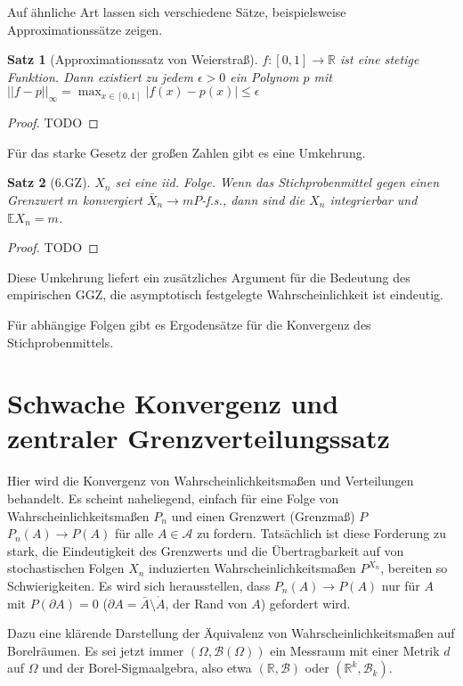 \documentclass[]{article}
\newtheorem{theorem}{Satz}
\begin{document}
Auf ähnliche Art lassen sich verschiedene Sätze, beispielsweise Approximationssätze zeigen.

\begin{theorem}[Approximationssatz von Weierstraß]
	$f:[0,1]\rightarrow\mathbb{R}$ ist eine stetige Funktion. Dann existiert zu jedem $\epsilon > 0$ ein Polynom $p$ mit $||f-p||_\infty = \max_{x\in[0,1]}|f(x)-p(x)| \leq \epsilon$
\end{theorem}

\begin{proof}
	TODO
\end{proof}

Für das starke Gesetz der großen Zahlen gibt es eine Umkehrung.
\begin{theorem}[6.GZ]
	$X_n$ sei eine iid. Folge. Wenn das Stichprobenmittel gegen einen Grenzwert $m$ konvergiert $\bar{X}_n\rightarrow m P$-f.s., dann sind die $X_n$ integrierbar und $\mathbb{E}X_n = m$.
\end{theorem}

\begin{proof}
	TODO
\end{proof}

Diese Umkehrung liefert ein zusätzliches Argument für die Bedeutung des empirischen GGZ, die asymptotisch festgelegte Wahrscheinlichkeit ist eindeutig.

Für abhängige Folgen gibt es Ergodensätze für die Konvergenz des Stichprobenmittels.

\section{Schwache Konvergenz und zentraler Grenzverteilungssatz}
Hier wird die Konvergenz von Wahrscheinlichkeitsmaßen und Verteilungen behandelt. Es scheint naheliegend, einfach für eine Folge von Wahrscheinlichkeitsmaßen $P_n$ und einen Grenzwert (Grenzmaß) $P$ $P_n(A)\rightarrow P(A)$ für alle $A\in \mathcal{A}$ zu fordern. Tatsächlich ist diese Forderung zu stark, die Eindeutigkeit des Grenzwerts und die Übertragbarkeit auf von stochastischen Folgen $X_n$ induzierten Wahrscheinlichkeitsmaßen $P^{X_n}$, bereiten so Schwierigkeiten. Es wird sich herausstellen, dass $P_n(A)\rightarrow P(A)$ nur für $A$ mit $P(\partial A) = 0$ ($\partial A = \bar{A}\setminus\mathring{A}$, der Rand von $A$) gefordert wird.

Dazu eine klärende Darstellung der Äquivalenz von Wahrscheinlichkeitsmaßen auf Borelräumen. Es sei jetzt immer $(\Omega, \mathcal{B}(\Omega))$ ein Messraum mit einer Metrik $d$ auf $\Omega$ und der Borel-Sigmaalgebra, also etwa $(\mathbb{R}, \mathcal{B})$ oder $(\mathbb{R}^k, \mathcal{B}_k)$.
\end{document}
